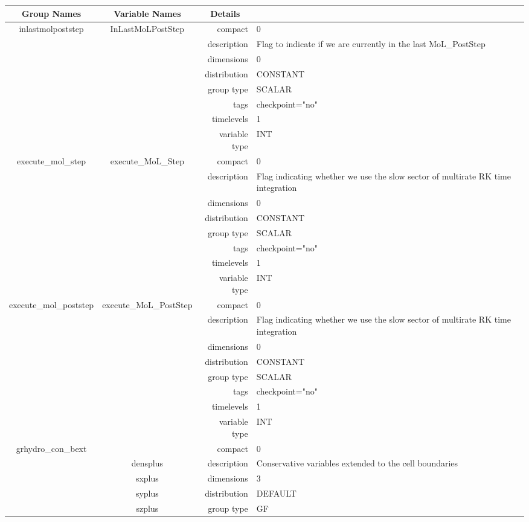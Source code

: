 \documentclass{article}
\begin{document}
\begin{tabular*}{150mm}{|c|c@{\extracolsep{\fill}}|rl|} \hline 
~ {\bf Group Names} ~ & ~ {\bf Variable Names} ~  &{\bf Details} ~ & ~\\ 
\hline 
inlastmolpoststep & InLastMoLPostStep & compact & 0 \\ 
 &  & description & Flag to indicate if we are currently in the last MoL\_PostStep \\ 
 &  & dimensions & 0 \\ 
 &  & distribution & CONSTANT \\ 
 &  & group type & SCALAR \\ 
 &  & tags & checkpoint="no" \\ 
 &  & timelevels & 1 \\ 
 &  & variable type & INT \\ 
\hline 
execute\_mol\_step & execute\_MoL\_Step & compact & 0 \\ 
 &  & description & Flag indicating whether we use the slow sector of multirate RK time integration \\ 
 &  & dimensions & 0 \\ 
 &  & distribution & CONSTANT \\ 
 &  & group type & SCALAR \\ 
 &  & tags & checkpoint="no" \\ 
 &  & timelevels & 1 \\ 
 &  & variable type & INT \\ 
\hline 
execute\_mol\_poststep & execute\_MoL\_PostStep & compact & 0 \\ 
 &  & description & Flag indicating whether we use the slow sector of multirate RK time integration \\ 
 &  & dimensions & 0 \\ 
 &  & distribution & CONSTANT \\ 
 &  & group type & SCALAR \\ 
 &  & tags & checkpoint="no" \\ 
 &  & timelevels & 1 \\ 
 &  & variable type & INT \\ 
\hline 
grhydro\_con\_bext &  & compact & 0 \\ 
 & densplus & description & Conservative variables extended to the cell boundaries \\ 
 & sxplus & dimensions & 3 \\ 
 & syplus & distribution & DEFAULT \\ 
 & szplus & group type & GF \\ 

\end{tabular*}
\end{document}
